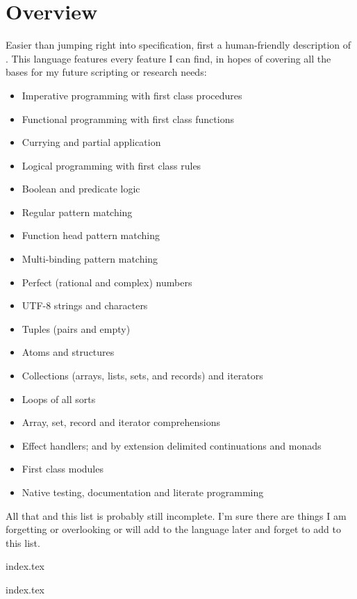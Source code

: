 \section{Overview}

Easier than jumping right into specification, first a human-friendly
description of \Trilogy{}. This language features every feature I can
find, in hopes of covering all the bases for my future scripting or
research needs:

\begin{itemize}
    \item Imperative programming with first class procedures
    \item Functional programming with first class functions
    \item Currying and partial application
    \item Logical programming with first class rules
    \item Boolean and predicate logic
    \item Regular pattern matching
    \item Function head pattern matching
    \item Multi-binding pattern matching
    \item Perfect (rational and complex) numbers
    \item UTF-8 strings and characters
    \item Tuples (pairs and empty)
    \item Atoms and structures
    \item Collections (arrays, lists, sets, and records) and iterators
    \item Loops of all sorts
    \item Array, set, record and iterator comprehensions
    \item Effect handlers; and by extension delimited continuations and monads
    \item First class modules
    \item Native testing, documentation and literate programming
\end{itemize}

\noindent
All that and this list is probably still incomplete. I'm sure there are things
I am forgetting or overlooking or will add to the language later and forget to
add to this list.

{index.tex}

{index.tex}
